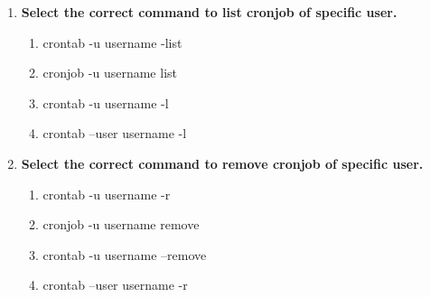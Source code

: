 \begin{flushleft}
\begin{enumerate}
		\item \textbf{Select the correct command to list cronjob of specific user.}
		\begin{enumerate}[label=(\alph*)]
			\item crontab -u username -list
			\item cronjob -u username list
			\item crontab -u username -l  %
			\item crontab --user username -l
		\end{enumerate}
		\bigskip
		\bigskip	
		
		
		\item \textbf{Select the correct command to remove cronjob of specific user.}
		\begin{enumerate}[label=(\alph*)]
			\item crontab -u username -r  %
			\item cronjob -u username remove
			\item crontab -u username --remove  
			\item crontab --user username -r
		\end{enumerate}
	\end{enumerate}
\end{flushleft}

